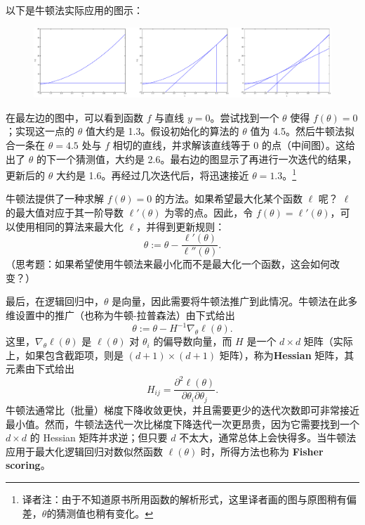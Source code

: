 以下是牛顿法实际应用的图示：

\begin{figure}[H]
  \centering
  \includegraphics[width=0.93\linewidth]{figs/newton_iteration.pdf}
\end{figure}

\setcounter{footnote}{0}
\renewcommand{\thefootnote}{\fnsymbol{footnote}}
在最左边的图中，可以看到函数 $f$ 与直线 $y=0$。尝试找到一个 $\theta$ 使得 $f(\theta)=0$；实现这一点的 $\theta$ 值大约是 1.3。假设初始化的算法的 $\theta$ 值为 4.5。然后牛顿法拟合一条在 $\theta=4.5$ 处与 $f$ 相切的直线，并求解该直线等于 0 的点（中间图）。这给出了 $\theta$ 的下一个猜测值，大约是 2.6。最右边的图显示了再进行一次迭代的结果，更新后的 $\theta$ 大约是 1.6。再经过几次迭代后，将迅速接近 $\theta = 1.3$。\footnote{译者注：由于不知道原书所用函数的解析形式，这里译者画的图与原图稍有偏差，$\theta$的猜测值也稍有变化。}
\setcounter{footnote}{1}
\renewcommand{\thefootnote}{\arabic{footnote}}

牛顿法提供了一种求解 $f(\theta)=0$ 的方法。如果希望最大化某个函数 $\ell$ 呢？ $\ell$ 的最大值对应于其一阶导数 $\ell'(\theta)$ 为零的点。因此，令 $f(\theta) = \ell'(\theta)$，可以使用相同的算法来最大化 $\ell$，并得到更新规则：
\[
    \theta := \theta - \frac{\ell'(\theta)}{\ell''(\theta)}.
\]
（思考题：如果希望使用牛顿法来最小化而不是最大化一个函数，这会如何改变？）

最后，在逻辑回归中，$\theta$ 是向量，因此需要将牛顿法推广到此情况。牛顿法在此多维设置中的推广（也称为牛顿-拉普森法）由下式给出
\[
    \theta := \theta - H^{-1} \nabla_\theta \ell(\theta).
\]
这里，$\nabla_\theta \ell(\theta)$ 是 $\ell(\theta)$ 对 $\theta_i$ 的偏导数向量，而 $H$ 是一个 $d \times d$ 矩阵（实际上，如果包含截距项，则是 $(d+1) \times (d+1)$ 矩阵），称为\textbf{Hessian} 矩阵，其元素由下式给出
\[
    H_{ij} = \frac{\partial^2 \ell(\theta)}{\partial \theta_i \partial \theta_j}.
\]
牛顿法通常比（批量）梯度下降收敛更快，并且需要更少的迭代次数即可非常接近最小值。然而，牛顿法迭代一次比梯度下降迭代一次更昂贵，因为它需要找到一个 $d \times d$ 的 Hessian 矩阵并求逆；但只要 $d$ 不太大，通常总体上会快得多。当牛顿法应用于最大化逻辑回归对数似然函数 $\ell(\theta)$ 时，所得方法也称为 \textbf{Fisher scoring}。